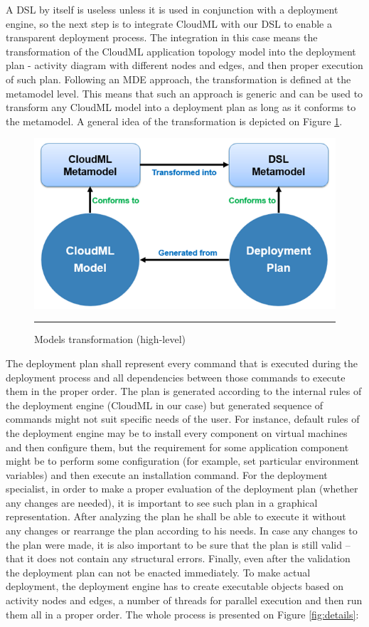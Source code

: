 \noindent A DSL by itself is useless unless it is used in conjunction with a deployment engine, so the next step is to integrate CloudML with our DSL to enable a transparent deployment process. The integration in this case means the transformation of the CloudML application topology model into the deployment plan - activity diagram with different nodes and edges, and then proper execution of such plan. Following an MDE approach, the transformation is defined at the metamodel level. This means that such an approach is generic and can be used to transform any CloudML model into a deployment plan as long as it conforms to the metamodel. A general idea of the transformation is depicted on Figure \ref{fig:high}.

\noindent 

\begin{figure}[htbp]
	\centering
		\includegraphics[width=32em]{./Figures/Transformation}
		\rule{38em}{0.5pt}
	\caption[High-level Transformation]{Models transformation (high-level)}
	\label{fig:high}
\end{figure}

\noindent 

\noindent The deployment plan shall represent every command that is executed during the deployment process and all dependencies between those commands to execute them in the proper order. The plan is generated according to the internal rules of the deployment engine (CloudML in our case) but generated sequence of commands might not suit specific needs of the user. For instance, default rules of the deployment engine may be to install every component on virtual machines and then configure them, but the requirement for some application component might be to perform some configuration (for example, set particular environment variables) and then execute an installation command. For the deployment specialist, in order to make a proper evaluation of the deployment plan (whether any changes are needed), it is important to see such plan in a graphical representation. After analyzing the plan he shall be able to execute it without any changes or rearrange the plan according to his needs. In case any changes to the plan were made, it is also important to be sure that the plan is still valid -- that it does not contain any structural errors. Finally, even after the validation the deployment plan can not be enacted immediately. To make actual deployment, the deployment engine has to create executable objects based on activity nodes and edges, a number of threads for parallel execution and then run them all in a proper order. The whole process is presented on Figure \ref{fig:details}:

